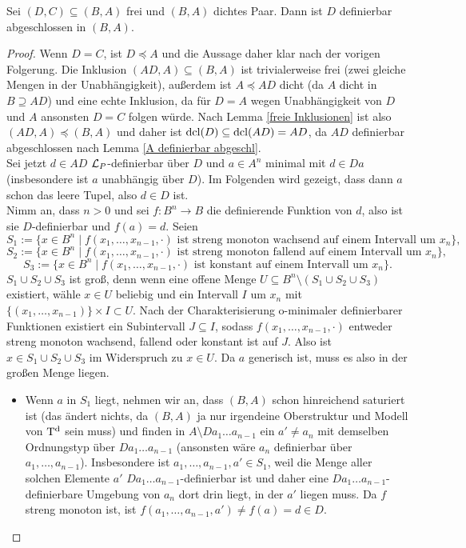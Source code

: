 \begin{lemma}\label{Freie Definierbarkeit}
	Sei $(D,C)\subseteq(B,A)$ frei und $(B,A)$ dichtes Paar. Dann ist $D$ definierbar abgeschlossen in $(B,A)$.
\end{lemma}
\begin{proof}
	Wenn $D=C$, ist $D\preceq A$ und die Aussage daher klar nach der vorigen Folgerung. Die Inklusion $(AD,A)\subseteq(B,A)$ ist trivialerweise frei (zwei gleiche Mengen in der Unabhängigkeit), außerdem ist $A\preceq AD$ dicht (da $A$ dicht in $B\supseteq AD$) und eine echte Inklusion, da für $D=A$ wegen Unabhängigkeit von $D$ und $A$ ansonsten $D=C$ folgen würde. Nach Lemma \ref{freie Inklusionen} ist also $(AD,A)\preceq(B,A)$ und daher ist $\operatorname{dcl}(D)\subseteq\operatorname{dcl}(AD)=AD$, da $AD$ definierbar abgeschlossen nach Lemma \ref{A definierbar abgeschl}.\\
	Sei jetzt $d\in AD$ $\mathcal{L}_P$-definierbar über $D$ und $a\in A^n$ minimal mit $d\in Da$ (insbesondere ist $a$ unabhängig über $D$). Im Folgenden wird gezeigt, dass dann $a$ schon das leere Tupel, also $d\in D$ ist.\\
	Nimm an, dass $n>0$ und sei $f:B^n\rightarrow B$ die definierende Funktion von $d$, also ist sie $D$-definierbar und $f(a)=d$. Seien $$S_1:=\{x\in B^n\mid f(x_1,\dots,x_{n-1},\cdot)\text{ ist streng monoton wachsend auf einem Intervall um }x_n\},$$ $$S_2:=\{x\in B^n\mid f(x_1,\dots,x_{n-1},\cdot)\text{ ist streng monoton fallend auf einem Intervall um }x_n\},$$ $$S_3:=\{x\in B^n\mid f(x_1,\dots,x_{n-1},\cdot)\text{ ist konstant auf einem Intervall um }x_n\}.$$
	$S_1\cup S_2\cup S_3$ ist groß, denn wenn eine offene Menge $U\subseteq B^n\setminus(S_1\cup S_2\cup S_3)$ existiert, wähle $x\in U$ beliebig und ein Intervall $I$ um $x_n$ mit $\{(x_1,\dots,x_{n-1})\}\times I\subset U$. Nach der Charakterisierung o-minimaler definierbarer Funktionen existiert ein Subintervall $J\subseteq I$, sodass $f(x_1,\dots,x_{n-1},\cdot)$ entweder streng monoton wachsend, fallend oder konstant ist auf $J$. Also ist $x\in S_1\cup S_2\cup S_3$ im Widerspruch zu $x\in U$.\newpage
	Da $a$ generisch ist, muss es also in der großen Menge liegen.
	\begin{itemize}
		\item Wenn $a$ in $S_1$ liegt, nehmen wir an, dass $(B,A)$ schon hinreichend saturiert ist (das ändert nichts, da $(B,A)$ ja nur irgendeine Oberstruktur und Modell von $\operatorname{T^d}$ sein muss) und finden in $A\setminus Da_1\dots a_{n-1}$ ein $a'\neq a_n$ mit demselben Ordnungstyp über $Da_1\dots a_{n-1}$ (ansonsten wäre $a_n$ definierbar über $a_1,\dots,a_{n-1}$). Insbesondere ist $a_1,\dots,a_{n-1},a'\in S_1$, weil die Menge aller solchen Elemente $a'$ $Da_1\dots a_{n-1}$-definierbar ist und daher eine $Da_1\dots a_{n-1}$-definierbare Umgebung von $a_n$ dort drin liegt, in der $a'$ liegen muss. Da $f$ streng monoton ist, ist $f(a_1,\dots,a_{n-1},a')\neq f(a)=d\in D$.\\

\end{itemize}
\end{proof}
